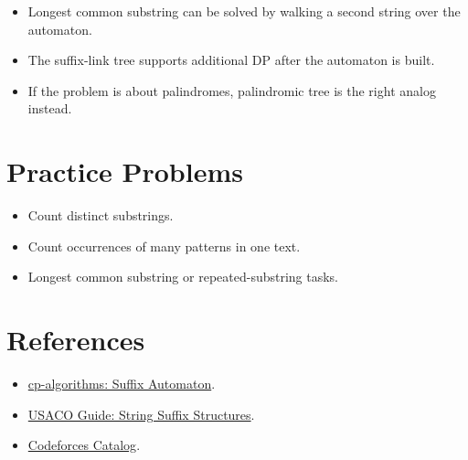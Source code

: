 \begin{itemize}
  \item Longest common substring can be solved by walking a second string over the automaton.
  \item The suffix-link tree supports additional DP after the automaton is built.
  \item If the problem is about palindromes, palindromic tree is the right analog instead.
\end{itemize}

\section*{Practice Problems}

\begin{itemize}
  \item Count distinct substrings.
  \item Count occurrences of many patterns in one text.
  \item Longest common substring or repeated-substring tasks.
\end{itemize}

\section*{References}

\begin{itemize}
  \item \href{https://cp-algorithms.com/string/suffix-automaton.html}{cp-algorithms: Suffix Automaton}.
  \item \href{https://usaco.guide/adv/string-suffix}{USACO Guide: String Suffix Structures}.
  \item \href{https://codeforces.com/catalog}{Codeforces Catalog}.
\end{itemize}

